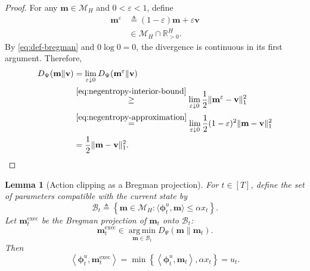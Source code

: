 \documentclass[journal]{IEEEtran}
\newtheorem{lemma}{Lemma}
\theoremstyle{remark}
\begin{document}
\begin{proof}
For any $\mathbf{m}\in\mathcal{M}_H$ and $0<\varepsilon<1$, define
\begin{equation}
\label{eq:negentropy-approximation}
\begin{aligned}
\mathbf{m}^{\varepsilon}
&\triangleq(1-\varepsilon)\mathbf{m}+\varepsilon\mathbf{v}\\
&\in\mathcal{M}_H\cap\mathbb{R}_{>0}^H.
\end{aligned}
\end{equation}
By \eqref{eq:def-bregman} and $0\log0=0$, the divergence is continuous
in its first argument. Therefore,
\begin{align*}
D_\Psi(\mathbf{m}\|\mathbf{v})
&=\lim_{\varepsilon\downarrow0}
D_\Psi(\mathbf{m}^{\varepsilon}\|\mathbf{v})\\
&\overset{\eqref{eq:negentropy-interior-bound}}{\ge}
\lim_{\varepsilon\downarrow0}
\frac12\|\mathbf{m}^{\varepsilon}-\mathbf{v}\|_1^2\\
&\overset{\eqref{eq:negentropy-approximation}}{=}
\lim_{\varepsilon\downarrow0}
\frac12(1-\varepsilon)^2\|\mathbf{m}-\mathbf{v}\|_1^2\\
&=\frac12\|\mathbf{m}-\mathbf{v}\|_1^2.\qedhere
\end{align*}
\end{proof}


\begin{lemma}[Action clipping as a Bregman projection]
\label{lem:availability-projection}
For $t\in[T]$, define the set of parameters compatible with the current state by
\begin{equation}
\label{eq:availability-set}
\mathcal{B}_t
\triangleq
\left\{
\mathbf{m}\in\mathcal{M}_H:
\langle\boldsymbol{\phi}_t^u,\mathbf{m}\rangle
\le \alpha x_t
\right\}.
\end{equation}
Let $\mathbf{m}_t^{\mathrm{exec}}$ be the Bregman projection of
$\mathbf{m}_t$ onto $\mathcal{B}_t$:
\begin{equation}
\label{eq:availability-projection}
\mathbf{m}_t^{\mathrm{exec}}
\in
\operatorname*{arg\,min}_{\mathbf{m}\in\mathcal{B}_t}
D_\Psi(\mathbf{m}\|\mathbf{m}_t).
\end{equation}
Then
\begin{equation}
\label{eq:availability-clipped-action}
\left\langle
\boldsymbol{\phi}_t^u,\mathbf{m}_t^{\mathrm{exec}}
\right\rangle
=
\min\!\left\{
\left\langle\boldsymbol{\phi}_t^u,\mathbf{m}_t\right\rangle,
\alpha x_t
\right\}
=u_t.
\end{equation}
\end{lemma}
\end{document}
